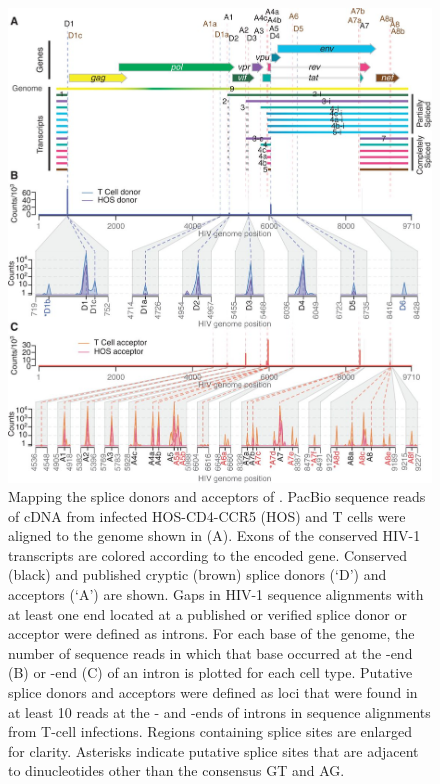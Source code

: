 \documentclass[../sherrill-Mix_thesis.tex]{subfiles}
\begin{document}
\begin{figure}
	\centering
	\includegraphics[width=.92\textwidth]{F1_large.jpg}
	\caption[Mapping the splice donors and acceptors of \hivEight{}]{Mapping the splice donors and acceptors of \hivEight{}. PacBio sequence reads of \hivEight{} cDNA from infected HOS-CD4-CCR5 (HOS) and \cdFour{} T cells were aligned to the \hivEight{} genome shown in (A). Exons of the conserved HIV-1 transcripts are colored according to the encoded gene. Conserved (black) and published cryptic (brown) splice donors (`D') and acceptors (`A') are shown. Gaps in HIV-1 sequence alignments with at least one end located at a published or verified splice donor or acceptor were defined as introns. For each base of the \hivEight{} genome, the number of sequence reads in which that base occurred at the \fivePrime{}-end (B) or \threePrime{}-end (C) of an intron is plotted for each cell type. Putative splice donors and acceptors were defined as loci that were found in at least 10 reads at the \fivePrime{}- and \threePrime{}-ends of introns in sequence alignments from T-cell infections. Regions containing splice sites are enlarged for clarity. Asterisks indicate putative splice sites that are adjacent to dinucleotides other than the consensus GT and AG.}
	\label{figDonorAccept}
\end{figure}
\end{document}
